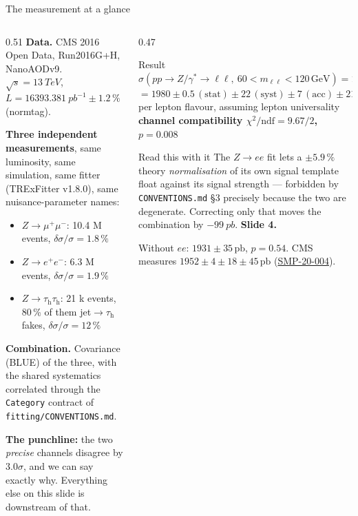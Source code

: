 \documentclass[aspectratio=169,9pt,t]{beamer}
\newcommand{\Z}{\ensuremath{Z/\gamma^{*}}}
\newcommand{\tauh}{\ensuremath{\tau_{\mathrm{h}}}}
\newcommand{\thth}{\ensuremath{\tauh\tauh}}
\newcommand{\ee}{\ensuremath{ee}}
\newcommand{\mll}{\ensuremath{m_{\ell\ell}}}
\newcommand{\pb}{\ensuremath{\,\mathrm{pb}}}
\newcommand{\sigll}{\ensuremath{\sigma(pp\to\Z\to\ell\ell,\ 60<\mll<120\,\mathrm{GeV})}}
\begin{document}
\begin{frame}{The measurement at a glance}
\begin{columns}[T]
\begin{column}{0.51\textwidth}
\small
\textbf{Data.} CMS 2016 Open Data, Run2016G+H, NanoAODv9.\\
$\sqrt{s} = \SI{13}{TeV}$, $L = \SI{16393.381}{pb^{-1}} \pm 1.2\,\%$ (normtag).

\medskip
\textbf{Three independent measurements}, same luminosity, same simulation, same fitter
(TRExFitter v1.8.0), same nuisance-parameter names:
\begin{itemize}\setlength\itemsep{1pt}
\item \textcolor{mumu}{$Z\to\mu^{+}\mu^{-}$}: 10.4 M events, $\delta\sigma/\sigma = 1.8\,\%$
\item \textcolor{ee}{$Z\to e^{+}e^{-}$}: 6.3 M events, $\delta\sigma/\sigma = 1.9\,\%$
\item \textcolor{tautau}{$Z\to\thth$}: 21 k events, 80\,\% of them jet$\to$\tauh{} fakes,
      $\delta\sigma/\sigma = 12\,\%$
\end{itemize}

\medskip
\textbf{Combination.} Covariance (BLUE) of the three, with the shared systematics correlated
through the \texttt{Category} contract of \texttt{fitting/CONVENTIONS.md}.

\medskip
\textbf{The punchline:} the two \emph{precise} channels \alert{disagree by $3.0\sigma$}, and we can
say exactly why. Everything else on this slide is downstream of that.
\end{column}

\begin{column}{0.47\textwidth}
\vspace{-2mm}
\begin{block}{Result}
\centering
$\sigll = \mathbf{1980 \pm 32}\pb$\\[3pt]
{\footnotesize $= 1980 \pm 0.5\,(\text{stat}) \pm 22\,(\text{syst}) \pm 7\,(\text{acc})
 \pm 21\,(\text{lumi})\pb$}\\[4pt]
{\footnotesize per lepton flavour, assuming lepton universality}\\[4pt]
{\footnotesize\color{warn}\textbf{channel compatibility
 $\chi^{2}/\mathrm{ndf} = 9.67/2$, $p = 0.008$}}
\end{block}
\begin{alertblock}{Read this with it}
{\footnotesize The $Z\to\ee$ fit lets a $\pm5.9\,\%$ theory \emph{normalisation} of its own signal
template float against its signal strength --- forbidden by \texttt{CONVENTIONS.md} \S3 precisely
because the two are degenerate. Correcting only that moves the combination by $-\SI{99}{pb}$.
\textbf{Slide 4.}}
\end{alertblock}
\vspace{-1mm}
{\footnotesize Without $\ee$: $1931 \pm 35\pb$, $p = 0.54$. CMS measures
$1952 \pm 4 \pm 18 \pm 45\pb$ (\href{https://arxiv.org/abs/2408.03744}{SMP-20-004}).}
\end{column}
\end{columns}
\end{frame}
\end{document}

